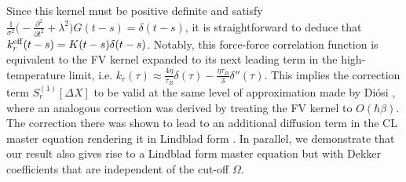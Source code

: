 \documentclass[prl,twocolumn,superscriptaddress,amsmath,amssymb]{revtex4-2}
\newcommand{\hb}{\hbar}
\begin{document}
Since this kernel must be positive definite and satisfy $\frac{1}{\sigma^2}\big(-\frac{\partial^2}{\partial t^2} + \lambda^2\big)G(t-s)=\delta(t-s)$, it is straightforward to deduce that $k^{\rm eff}_r(t-s)=K(t-s)\delta(t-s)$. Notably, this force-force correlation function is equivalent to the FV kernel expanded to its next leading term in the high-temperature limit, i.e. $k_r(\tau)\approx \frac{4\eta}{\tau_B}\delta(\tau) - \frac{\eta\tau_B}{3}\delta''(\tau)$. This implies the correction term $S^{(1)}_r[\Delta X]$ to be valid at the same level of approximation made by Di\'{o}si \cite{Diosi1993,Diosi1993a}, where an analogous correction was derived by treating the FV kernel to $O(\hb\beta)$. The correction there was shown to lead to an additional diffusion term in the CL master equation rendering it in Lindblad form \cite{Diosi1993,Diosi1993a}. In parallel, we demonstrate that our result also gives rise to a Lindblad form master equation but with Dekker coefficients \cite{Dekker1977,Dekker1981} that are independent of the cut-off $\Omega$.
\end{document}
